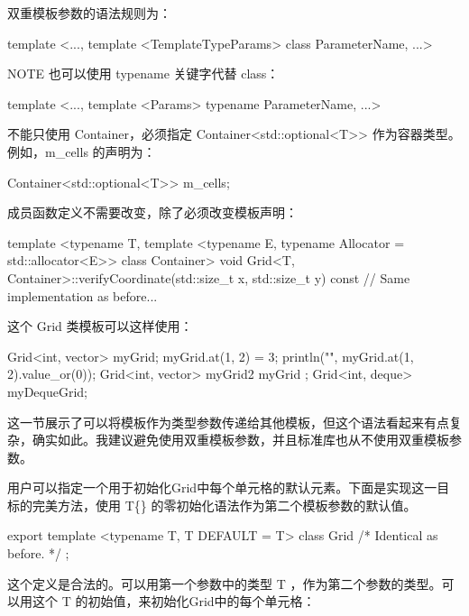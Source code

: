 双重模板参数的语法规则为：

\begin{cpp}
template <..., template <TemplateTypeParams> class ParameterName, ...>
\end{cpp}

\begin{myNotic}{NOTE}
也可以使用 typename 关键字代替 class：

\begin{cpp}
template <..., template <Params> typename ParameterName, ...>
\end{cpp}
\end{myNotic}

不能只使用 Container，必须指定 Container<std::optional<T>{}> 作为容器类型。例如，m\_cells 的声明为：

\begin{cpp}
Container<std::optional<T>> m_cells;
\end{cpp}

成员函数定义不需要改变，除了必须改变模板声明：

\begin{cpp}
template <typename T,
    template <typename E, typename Allocator = std::allocator<E>> class Container>
void Grid<T, Container>::verifyCoordinate(std::size_t x, std::size_t y) const
{
    // Same implementation as before...
}
\end{cpp}

这个 Grid 类模板可以这样使用：

\begin{cpp}
Grid<int, vector> myGrid;
myGrid.at(1, 2) = 3;
println("{}", myGrid.at(1, 2).value_or(0));
Grid<int, vector> myGrid2 { myGrid };
Grid<int, deque> myDequeGrid;
\end{cpp}

这一节展示了可以将模板作为类型参数传递给其他模板，但这个语法看起来有点复杂，确实如此。我建议避免使用双重模板参数，并且标准库也从不使用双重模板参数。


用户可以指定一个用于初始化Grid中每个单元格的默认元素。下面是实现这一目标的完美方法，使用 T\{\} 的零初始化语法作为第二个模板参数的默认值。

\begin{cpp}
export template <typename T, T DEFAULT = T{}>
class Grid { /* Identical as before. */ };
\end{cpp}

这个定义是合法的。可以用第一个参数中的类型 T ，作为第二个参数的类型。可以用这个 T 的初始值，来初始化Grid中的每个单元格：

